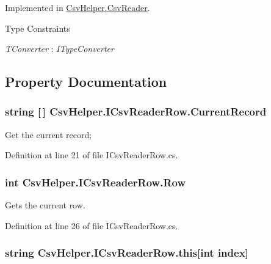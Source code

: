 Implemented in \hyperlink{a00077_a6665d63535ab6ca768ffbc76c1347e58}{Csv\-Helper.\-Csv\-Reader}.

\begin{Desc}
\item[Type Constraints]\begin{description}
\item[{\em T\-Converter} : {\em I\-Type\-Converter}]\end{description}
\end{Desc}


\subsection{Property Documentation}
\hypertarget{a00115_a4e8958e51331591b1d9e811e32bd92d0}{
\subsubsection[{Current\-Record}]{\setlength{\rightskip}{0pt plus 5cm}string \mbox{[}$\,$\mbox{]} Csv\-Helper.\-I\-Csv\-Reader\-Row.\-Current\-Record\hspace{0.3cm}{\ttfamily [get]}}}\label{a00115_a4e8958e51331591b1d9e811e32bd92d0}


Get the current record; 



Definition at line 21 of file I\-Csv\-Reader\-Row.\-cs.

\hypertarget{a00115_ac1bd960358282c70f0b85de90f00b446}{
\subsubsection[{Row}]{\setlength{\rightskip}{0pt plus 5cm}int Csv\-Helper.\-I\-Csv\-Reader\-Row.\-Row\hspace{0.3cm}{\ttfamily [get]}}}\label{a00115_ac1bd960358282c70f0b85de90f00b446}


Gets the current row. 



Definition at line 26 of file I\-Csv\-Reader\-Row.\-cs.

\hypertarget{a00115_a45d5b14c7382418d90b4c085c2bdc7dc}{
\subsubsection[{this[int index]}]{\setlength{\rightskip}{0pt plus 5cm}string Csv\-Helper.\-I\-Csv\-Reader\-Row.\-this\mbox{[}int index\mbox{]}\hspace{0.3cm}{\ttfamily [get]}}}\label{a00115_a45d5b14c7382418d90b4c085c2bdc7dc}


